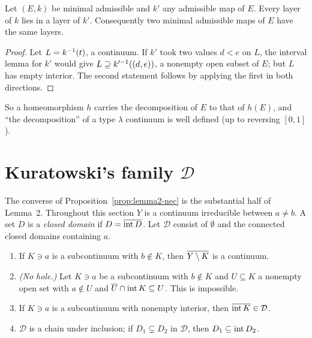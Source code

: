 
\begin{theorem}\label{thm:unique-decomp}
Let $(E,k)$ be minimal admissible and $k'$ any admissible map of $E$. Every layer of $k$ lies in a layer of
$k'$. Consequently two minimal admissible maps of $E$ have the same layers.
\end{theorem}

\begin{proof}
Let $L=k^{-1}(t)$, a continuum. If $k'$ took two values $d<e$ on $L$, the interval lemma for $k'$ would give
$L\supseteq k'^{-1}((d,e))$, a nonempty open subset of $E$; but $L$ has empty interior. The second statement
follows by applying the first in both directions.
\end{proof}


So a homeomorphism $h$ carries the decomposition of $E$ to that of $h(E)$, and ``the decomposition'' of a
type $\lambda$ continuum is well defined (up to reversing $[0,1]$).

\section{Kuratowski's family \texorpdfstring{$\mathcal D$}{D}}

The converse of Proposition~\ref{prop:lemma2-nec} is the substantial half of Lemma~2. Throughout this
section $Y$ is a continuum irreducible between $a\ne b$. A set $D$ is a \emph{closed domain} if
$D=\overline{\operatorname{int} D}$. Let $\mathcal D$ consist of $\emptyset$ and the connected closed domains containing $a$.


\begin{lemma}\label{lem:kur}
\leavevmode
\begin{enumerate}[label=(\alph*)]
\item If $K\ni a$ is a subcontinuum with $b\notin K$, then $\overline{Y\setminus K}$ is a continuum.
\item \emph{(No hole.)} Let $K\ni a$ be a subcontinuum with $b\notin K$ and $U\subseteq K$ a nonempty open set with
$a\notin U$ and $\overline{U}\cap\operatorname{int} K\subseteq U$. This is impossible.
\item If $K\ni a$ is a subcontinuum with nonempty interior, then $\overline{\operatorname{int} K}\in\mathcal D$.
\item $\mathcal D$ is a chain under inclusion; if $D_1\subsetneq D_2$ in $\mathcal D$, then $D_1\subseteq\operatorname{int} D_2$.
\end{enumerate}
\end{lemma}

